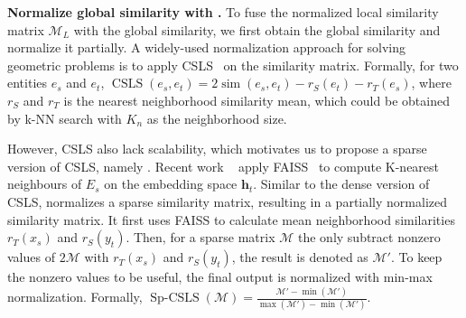\noindent
\textbf{Normalize global similarity with \SparseCSLS{}.} To fuse the normalized local similarity matrix $\mathcal{M}_{L}$ with the global similarity, we first obtain the global similarity and normalize it partially. 
A widely-used normalization approach for solving geometric problems is to apply CSLS~\cite{CSLS} on the similarity matrix. 
Formally, for two entities $e_s$ and $e_t$,
$\operatorname{CSLS}(e_s, e_t) = 2\operatorname{sim}(e_s, e_t) - r_S(e_t) - r_T(e_s)$, where $r_S$ and $r_T$ is the nearest neighborhood similarity mean, which could be obtained by k-NN search with $K_n$ as the neighborhood size. 


However, CSLS also lack scalability, which motivates us to propose a sparse version of CSLS, namely \SparseCSLS{}. Recent work ~\cite{LargeEA22, NoMatch21} apply FAISS~\cite{JDH17} to compute K-nearest neighbours of $E_s$ on the embedding space $\mathbf{h}_t$. Similar to the dense version of CSLS, \SparseCSLS{} normalizes a sparse similarity matrix, resulting in a partially normalized similarity matrix. It first uses FAISS to calculate mean neighborhood similarities  $r_{T}( x_{s})$ and $r_{S}(y_{t})$. Then, for a sparse matrix $\mathcal{M}$ the \SparseCSLS{} only subtract nonzero values of $2 \mathcal{M}$ with $r_{T}( x_{s})$ and $r_{S}(y_{t})$, the result is denoted as $\mathcal{M}'$. To keep the nonzero values to be useful, the final output is normalized with min-max normalization. Formally, $\operatorname{Sp-CSLS}(\mathcal{M}) =\frac{ \mathcal{M}' - \operatorname{min}(\mathcal{M}')}{ \operatorname{max}(\mathcal{M}') - \operatorname{min}(\mathcal{M}')}$.

